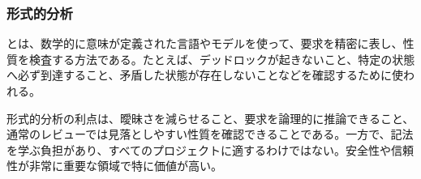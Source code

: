 \subsubsection{形式的分析}

とは、数学的に意味が定義された言語やモデルを使って、要求を精密に表し、性質を検査する方法である。たとえば、デッドロックが起きないこと、特定の状態へ必ず到達すること、矛盾した状態が存在しないことなどを確認するために使われる。

形式的分析の利点は、曖昧さを減らせること、要求を論理的に推論できること、通常のレビューでは見落としやすい性質を確認できることである。一方で、記法を学ぶ負担があり、すべてのプロジェクトに適するわけではない。安全性や信頼性が非常に重要な領域で特に価値が高い。
